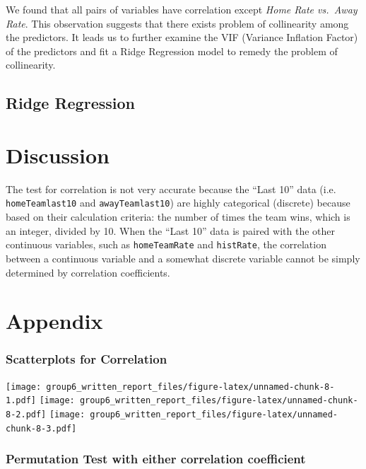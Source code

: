 \documentclass[]{article}
\begin{document}
We found that all pairs of variables have correlation except \emph{Home
Rate vs.~Away Rate}. This observation suggests that there exists problem
of collinearity among the predictors. It leads us to further examine the
VIF (Variance Inflation Factor) of the predictors and fit a Ridge
Regression model to remedy the problem of collinearity.

\subsection{Ridge Regression}\label{ridge-regression-1}

\section{Discussion}\label{discussion}

The test for correlation is not very accurate because the ``Last 10''
data (i.e. \texttt{homeTeamlast10} and \texttt{awayTeamlast10}) are
highly categorical (discrete) because based on their calculation
criteria: the number of times the team wins, which is an integer,
divided by 10. When the ``Last 10'' data is paired with the other
continuous variables, such as \texttt{homeTeamRate} and
\texttt{histRate}, the correlation between a continuous variable and a
somewhat discrete variable cannot be simply determined by correlation
coefficients.

\newpage

\section{Appendix}\label{appendix}

\subsubsection{Scatterplots for
Correlation}\label{scatterplots-for-correlation}

\texttt{[image: group6\_written\_report\_files/figure-latex/unnamed-chunk-8-1.pdf]}
\texttt{[image: group6\_written\_report\_files/figure-latex/unnamed-chunk-8-2.pdf]}
\texttt{[image: group6\_written\_report\_files/figure-latex/unnamed-chunk-8-3.pdf]}

\subsubsection{Permutation Test with either correlation
coefficient}\label{permutation-test-with-either-correlation-coefficient}
\end{document}

